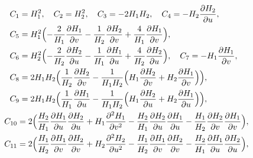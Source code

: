 \begin{eqnarray*}

& C_1=H_1^2,\quad C_2=H_2^2,\quad C_3=-2H_1H_2,\quad C_4=-H_2\frac{\partial H_2}{\partial u},

\\

& C_5=H_1^2\Bigl(-\frac{2}{H_1}\frac{\partial H_1}{\partial v}-\frac{1}{H_2}\frac{\partial H_2}{\partial v}+\frac{4}{H_1}\frac{\partial H_1}{\partial v}\Bigr),\\

& C_6=H_2^2\Bigl(-\frac{2}{H_2}\frac{\partial H_2}{\partial u}-\frac{1}{H_1}\frac{\partial H_1}{\partial u}+\frac{4}{H_2}\frac{\partial H_2}{\partial u}\Bigr),\quad 

C_7=-H_1\frac{\partial H_1}{\partial v},\\

&C_8=2H_1H_2\Bigl(\frac{1}{H_2}\frac{\partial H_2}{\partial v}-\frac{1}{H_1H_2}

\Bigl(H_1\frac{\partial H_2}{\partial v}+H_2\frac{\partial H_1}{\partial v}\Bigr)\Bigr),\\

&C_9=2H_1H_2\Bigl(\frac{1}{H_1}\frac{\partial H_1}{\partial u}-\frac{1}{H_1H_2}\Bigl(H_1\frac{\partial H_2}{\partial

u}+H_2\frac{\partial H_1}{\partial u}\Bigr)\Bigr),\\

&\!\!\!\!C_{10}=2\Bigl(\frac{H_2}{H_1}\frac{\partial H_1}{\partial

u}\frac{\partial H_2}{\partial u}+H_1\frac{\partial^2

H_1}{\partial v^2}-\frac{H_2}{H_1}\frac{\partial H_2}{\partial

u}\frac{\partial H_1}{\partial u}-\frac{H_1}{H_2}\frac{\partial

H_2}{\partial v}\frac{\partial H_1}{\partial v}\Bigr),\\

&\!\!\!\!C_{11}=2\Bigl(\frac{H_1}{H_2}\frac{\partial H_1}{\partial

v}\frac{\partial H_2}{\partial v}+H_2\frac{\partial^2

H_2}{\partial u^2}-\frac{H_1}{H_2}\frac{\partial H_1}{\partial

v}\frac{\partial H_2}{\partial v}-\frac{H_2}{H_1}\frac{\partial

H_1}{\partial

u}\frac{\partial H_2}{\partial u}\Bigr),\\


\end{eqnarray*}
